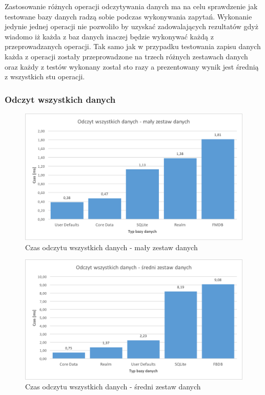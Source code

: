 Zastosowanie różnych operacji odczytywania danych ma na celu sprawdzenie jak testowane bazy danych radzą sobie podczas wykonywania zapytań. Wykonanie jedynie jednej operacji nie pozwoliło by uzyskać zadowalających rezultatów gdyż wiadomo iż każda z baz danych inaczej będzie wykonywać każdą z przeprowadzanych operacji. Tak samo jak w przypadku testowania zapisu danych każda z operacji zostały przeprowadzone na trzech różnych zestawach danych oraz każdy z testów wykonany został sto razy a prezentowany wynik jest średnią z wszystkich stu operacji. 

\newpage

\subsubsection{Odczyt wszystkich danych}

\begin{figure}[h]
\centering
	\includegraphics[width=13.5cm]{img/read_data/read_all/read_all_test_small.png}
	\caption{Czas odczytu wszystkich danych - mały zestaw danych}
	\label{fig: read-data-small}
\end{figure}

\begin{figure}[h]
\centering
	\includegraphics[width=13.5cm]{img/read_data/read_all/read_all_test_medium.png}
	\caption{Czas odczytu wszystkich danych - średni zestaw danych}
	\label{fig: read-data-medium}
\end{figure}

